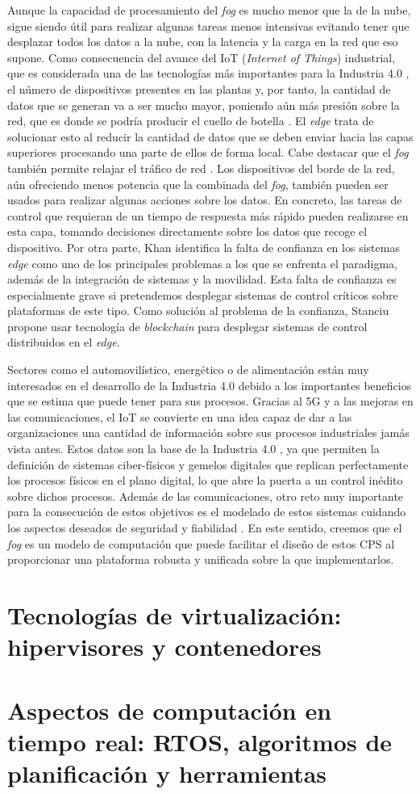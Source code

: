 Aunque la capacidad de procesamiento del \textit{fog} es mucho menor que la de
la nube, sigue siendo útil para realizar algunas tareas menos intensivas
evitando tener que desplazar todos los datos a la nube, con la latencia y la
carga en la red que eso supone. Como consecuencia del avance del IoT
(\textit{Internet of Things}) industrial, que es considerada una de las
tecnologías más importantes para la Industria 4.0 \cite{lu_industry_2017}, el
número de dispositivos presentes en las plantas y, por tanto, la cantidad de
datos que se generan va a ser mucho mayor, poniendo aún más presión sobre la
red, que es donde se podría producir el cuello de botella \cite{shi_edge_2016}.
El \textit{edge} trata de solucionar esto al reducir la cantidad de datos que se
deben enviar hacia las capas superiores procesando una parte de ellos de forma
local. Cabe destacar que el \textit{fog} también permite relajar el tráfico de
red \cite{wang_traffic_2019}. Los dispositivos del borde de la red, aún
ofreciendo menos potencia que la combinada del \textit{fog}, también pueden ser
usados para realizar algunas acciones sobre los datos. En concreto, las tareas
de control que requieran de un tiempo de respuesta más rápido pueden realizarse
en esta capa, tomando decisiones directamente sobre los datos que recoge el
dispositivo. Por otra parte, Khan \cite{khan_edge_2019} identifica la falta de
confianza en los sistemas \textit{edge} como uno de los principales problemas a
los que se enfrenta el paradigma, además de la integración de sistemas y la
movilidad. Esta falta de confianza es especialmente grave si pretendemos
desplegar sistemas de control críticos sobre plataformas de este tipo. Como
solución al problema de la confianza, Stanciu \cite{stanciu_blockchain_2017}
propone usar tecnología de \textit{blockchain} para desplegar sistemas de
control distribuidos en el \textit{edge}.

Sectores como el automovilístico, energético o de alimentación están muy
interesados en el desarrollo de la Industria 4.0 debido a los importantes
beneficios que se estima que puede tener para sus procesos. Gracias al 5G y a
las mejoras en las comunicaciones, el IoT se convierte en una idea capaz de dar
a las organizaciones una cantidad de información sobre sus procesos industriales
jamás vista antes. Estos datos son la base de la Industria 4.0
\cite{khan_perspective_2016}, ya que permiten la definición de sistemas
ciber-físicos y gemelos digitales que replican perfectamente los procesos
físicos en el plano digital, lo que abre la puerta a un control inédito sobre
dichos procesos. Además de las comunicaciones, otro reto muy importante para la
consecución de estos objetivos es el modelado de estos sistemas cuidando los
aspectos deseados de seguridad y fiabilidad \cite{farsi_industry_2019}. En este
sentido, creemos que el \textit{fog} es un modelo de computación que puede
facilitar el diseño de estos CPS al proporcionar una plataforma robusta y
unificada sobre la que implementarlos.

\section{Tecnologías de virtualización: hipervisores y contenedores}

\section{Aspectos de computación en tiempo real: RTOS, algoritmos de
  planificación y herramientas}
\label{sec:real-time}
